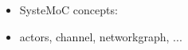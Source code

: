 \begin{frame}
\begin{itemize}
\item SysteMoC concepts:
\item actors, channel, networkgraph, ...
\end{itemize}
\end{frame}




